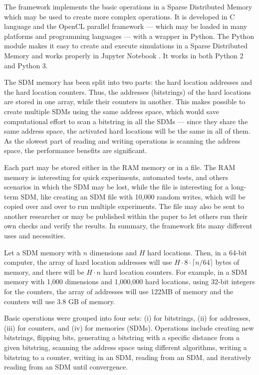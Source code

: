 
The framework implements the basic operations in a Sparse Distributed Memory which may be used to create more complex operations. It is developed in C language and the OpenCL parallel framework --- which may be loaded in many platforms and programming languages --- with a wrapper in Python. The Python module makes it easy to create and execute simulations in a Sparse Distributed Memory and works properly in Jupyter Notebook \citep{kluyver2016jupyter}. It works in both Python 2 and Python 3.

The SDM memory has been split into two parts: the hard location addresses and the hard location counters. Thus, the addresses (bitstrings) of the hard locations are stored in one array, while their counters in another. This makes possible to create multiple SDMs using the same address space, which would save computational effort to scan a bitstring in all the SDMs --- since they share the same address space, the activated hard locations will be the same in all of them. As the slowest part of reading and writing operations is scanning the address space, the performance benefits are significant.

Each part may be stored either in the RAM memory or in a file. The RAM memory is interesting for quick experiments, automated tests, and others scenarios in which the SDM may be lost, while the file is interesting for a long-term SDM, like creating an SDM file with 10,000 random writes, which will be copied over and over to run multiple experiments. The file may also be sent to another researcher or may be published within the paper to let others run their own checks and verify the results. In summary, the framework fits many different uses and necessities.

Let a SDM memory with $n$ dimensions and $H$ hard locations. Then, in a 64-bit computer, the array of hard location addresses will use $H \cdot 8 \cdot \lceil n/64 \rceil$ bytes of memory, and there will be $H \cdot n$ hard location counters. For example, in a SDM memory with 1,000 dimensions and 1,000,000 hard locations, using 32-bit integers for the counters, the array of addresses will use 122MB of memory and the counters will use 3.8 GB of memory.

Basic operations were grouped into four sets: (i) for bitstrings, (ii) for addresses, (iii) for counters, and (iv) for memories (SDMs). Operations include creating new bitstrings, flipping bits, generating a bitstring with a specific distance from a given bitstring, scanning the address space using different algorithms, writing a bitstring to a counter, writing in an SDM, reading from an SDM, and iteratively reading from an SDM until convergence.


